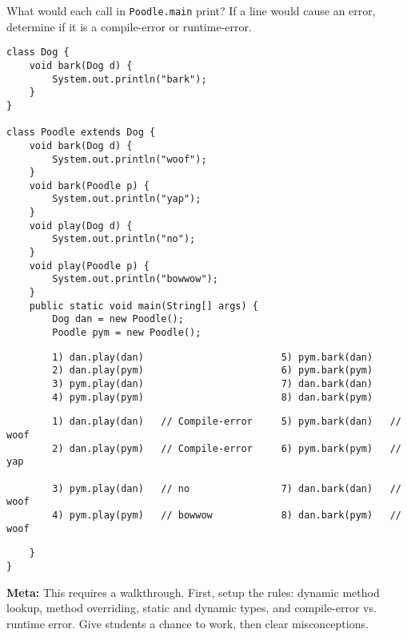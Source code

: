 \begin{blocksection}
\question What would each call in \lstinline$Poodle.main$ print? If a line
would cause an error, determine if it is a compile-error or runtime-error.

\begin{lstlisting}
class Dog {
    void bark(Dog d) {
        System.out.println("bark");
    }
}

class Poodle extends Dog {
    void bark(Dog d) {
        System.out.println("woof");
    }
    void bark(Poodle p) {
        System.out.println("yap");
    }
    void play(Dog d) {
        System.out.println("no");
    }
    void play(Poodle p) {
        System.out.println("bowwow");
    }
    public static void main(String[] args) {
        Dog dan = new Poodle();
        Poodle pym = new Poodle();
\end{lstlisting}
\ifprintanswers\else
\begin{lstlisting}
        1) dan.play(dan)                        5) pym.bark(dan)
        2) dan.play(pym)                        6) pym.bark(pym)
        3) pym.play(dan)                        7) dan.bark(dan)
        4) pym.play(pym)                        8) dan.bark(pym)
\end{lstlisting}
\fi
\begin{solution}
\begin{lstlisting}
        1) dan.play(dan)   // Compile-error     5) pym.bark(dan)   // woof
        2) dan.play(pym)   // Compile-error     6) pym.bark(pym)   // yap

        3) pym.play(dan)   // no                7) dan.bark(dan)   // woof
        4) pym.play(pym)   // bowwow            8) dan.bark(pym)   // woof
\end{lstlisting}
\end{solution}
\begin{lstlisting}
    }
}
\end{lstlisting}
\end{blocksection}

\begin{solution}
\textbf{Meta:} This requires a walkthrough. First, setup the rules: dynamic
method lookup, method overriding, static and dynamic types, and compile-error
vs. runtime error. Give students a chance to work, then clear misconceptions.
\end{solution}
